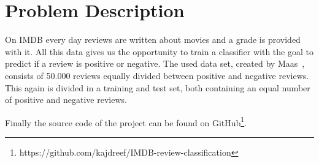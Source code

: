 \section{Problem Description}

On IMDB every day reviews are written about movies and a grade is provided with it.
All this data gives us the opportunity to train a classifier with the goal to predict if a review is positive or negative.
The used data set, created by Maas~\etal \cite{Maas:2011}, consists of 50.000 reviews equally divided between positive and negative reviews. 
This again is divided in a training and test set, both containing an equal number of positive and negative reviews.


Finally the source code of the project can be found on GitHub\footnote{https://github.com/kajdreef/IMDB-review-classification}.